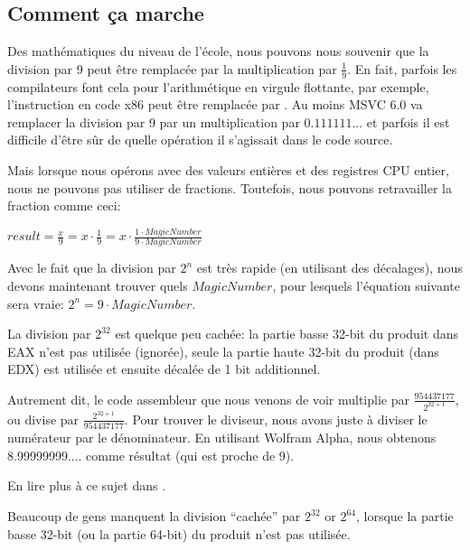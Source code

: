 ﻿\subsection{Comment ça marche}

Des mathématiques du niveau de l'école, nous pouvons nous souvenir que la division
par 9 peut être remplacée par la multiplication par $\frac{1}{9}$.
En fait, parfois les compilateurs font cela pour l'arithmétique en virgule flottante,
par exemple, l'instruction  en code x86 peut être remplacée par .
Au moins MSVC 6.0 va remplacer la division par 9 par un multiplication par $0.111111...$
et parfois il est difficile d'être sûr de quelle opération il s'agissait dans le
code source.

Mais lorsque nous opérons avec des valeurs entières et des registres CPU entier,
nous ne pouvons pas utiliser de fractions.
Toutefois, nous pouvons retravailler la fraction comme ceci:

\begin{center}
$result = \frac{x}{9} = x \cdot \frac{1}{9} = x \cdot \frac{1 \cdot MagicNumber}{9 \cdot MagicNumber}$
\end{center}

Avec le fait que la division par $2^n$ est très rapide (en utilisant des décalages),
nous devons maintenant trouver quels $MagicNumber$, pour lesquels l'équation suivante
sera vraie: $2^n = 9 \cdot MagicNumber$.

La division par $2^{32}$ est quelque peu cachée: la partie basse 32-bit du produit
dans EAX n'est pas utilisée (ignorée), seule la partie haute 32-bit du produit
(dans EDX) est utilisée et ensuite décalée de 1 bit additionnel.

Autrement dit, le code assembleur que nous venons de voir multiplie par {\Large $\frac{954437177}{2^{32+1}}$},
ou divise par {\Large $\frac{2^{32+1}}{954437177}$}.
Pour trouver le diviseur, nous avons juste à diviser le numérateur par le dénominateur.
En utilisant Wolfram Alpha, nous obtenons 8.99999999.... comme résultat (qui est
proche de 9).


En lire plus à ce sujet dans .

Beaucoup de gens manquent la division ``cachée'' par $2^{32}$ or $2^{64}$, lorsque
la partie basse 32-bit (ou la partie 64-bit) du produit n'est pas utilisée.


